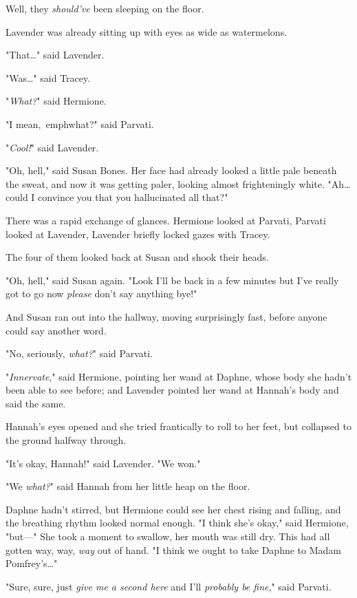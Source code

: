 Well, they \emph{should've} been sleeping on the floor.

Lavender was already sitting up with eyes as wide as watermelons.

"That{\ldots}" said Lavender.

"Was{\ldots}" said Tracey.

"\emph{What?}" said Hermione.

"I mean,\ emph{what?}" said Parvati.

"\emph{Cool!}" said Lavender.

"Oh, hell," said Susan Bones. Her face had already looked a little pale beneath 
the sweat, and now it was getting paler, looking almost frighteningly white. 
"Ah{\ldots} could I convince you that you hallucinated all that?"

There was a rapid exchange of glances. Hermione looked at Parvati, Parvati 
looked at Lavender, Lavender briefly locked gazes with Tracey.

The four of them looked back at Susan and shook their heads.

"Oh, hell," said Susan again. "Look I'll be back in a few minutes but I've 
really got to go now \emph{please} don't say anything bye!"

And Susan ran out into the hallway, moving surprisingly fast, before anyone 
could say another word.

"No, seriously, \emph{what?}" said Parvati.

"\emph{Innervate}," said Hermione, pointing her wand at Daphne, whose body she 
hadn't been able to see before; and Lavender pointed her wand at Hannah's body 
and said the same.

Hannah's eyes opened and she tried frantically to roll to her feet, but 
collapsed to the ground halfway through.

"It's okay, Hannah!" said Lavender. "We won."

"We \emph{what?}" said Hannah from her little heap on the floor.

Daphne hadn't stirred, but Hermione could see her chest rising and falling, and 
the breathing rhythm looked normal enough. "I think she's okay," said Hermione, 
"but---" She took a moment to swallow, her mouth was still dry. This had all 
gotten way, way, \emph{way} out of hand. "I think we ought to take Daphne to 
Madam Pomfrey's{\ldots}"

"Sure, sure, just \emph{give me a second here} and I'll \emph{probably be 
fine}," said Parvati.

